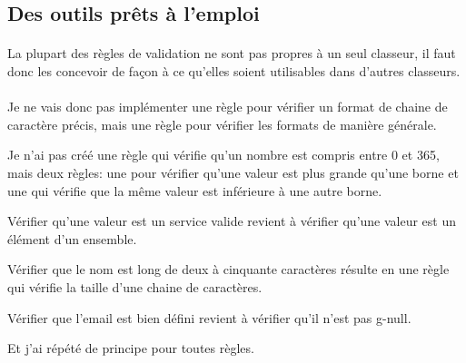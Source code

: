 \subsection{Des outils prêts à l'emploi}
\label{subsec:ready-tools}

\paragraph{}
La plupart des règles de validation ne sont pas propres à un seul classeur, il faut donc les concevoir de façon à ce qu'elles soient utilisables dans d'autres classeurs.

\paragraph{}
Je ne vais donc pas implémenter une règle pour vérifier un format de chaine de caractère précis, mais une règle pour vérifier les formats de manière générale.

Je n'ai pas créé une règle qui vérifie qu'un nombre est compris entre 0 et 365, mais deux règles: une pour vérifier qu'une valeur est plus grande qu'une borne et une qui vérifie que la même valeur est inférieure à une autre borne.

Vérifier qu'une valeur est un service valide revient à vérifier qu'une valeur est un élément d'un ensemble.

Vérifier que le nom est long de deux à cinquante caractères résulte en une règle qui vérifie la taille d'une chaine de caractères.

Vérifier que l'email est bien défini revient à vérifier qu'il n'est pas \gls{g-null}.

Et j'ai répété de principe pour toutes règles.

